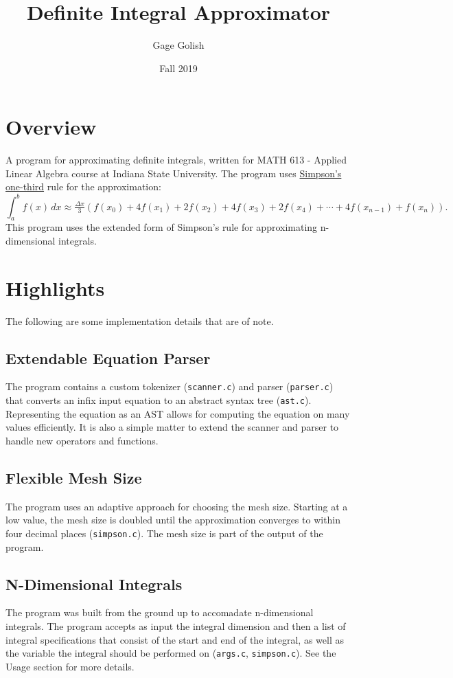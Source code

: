 \documentclass[11pt]{article}
\author{Gage Golish}
\date{Fall 2019}
\title{Definite Integral Approximator}
\begin{document}
\maketitle
\tableofcontents


\section{Overview}
\label{sec:orgc539d49}
A program for approximating definite integrals, written for MATH
613 - Applied Linear Algebra course at Indiana State University. The
program uses \href{https://en.wikipedia.org/wiki/Simpson\%27s\_rule}{Simpson's one-third} rule for the approximation:
$$\displaystyle \int _{a}^{b}f(x)\,dx\approx {\tfrac {\Delta
  x}{3}}\left(f(x_{0})+4f(x_{1})+2f(x_{2})+4f(x_{3})+2f(x_{4})+\cdots
  +4f(x_{n-1})+f(x_{n})\right).$$
This program uses the extended form of Simpson's rule for
approximating n-dimensional integrals.

\section{Highlights}
\label{sec:orge958625}
The following are some implementation details that are of note.

\subsection{Extendable Equation Parser}
\label{sec:org25a15be}
The program contains a custom tokenizer (\texttt{scanner.c}) and parser
(\texttt{parser.c}) that converts an infix input equation to an abstract
syntax tree (\texttt{ast.c}). Representing the equation as an AST allows
for computing the equation on many values efficiently. It is also a
simple matter to extend the scanner and parser to handle new
operators and functions.

\subsection{Flexible Mesh Size}
\label{sec:orgec9d46b}
The program uses an adaptive approach for choosing the mesh
size. Starting at a low value, the mesh size is doubled until the
approximation converges to within four decimal places (\texttt{simpson.c}). The
mesh size is part of the output of the program.

\subsection{N-Dimensional Integrals}
\label{sec:org3e83043}
The program was built from the ground up to accomadate
n-dimensional integrals. The program accepts as input the integral
dimension and then a list of integral specifications that consist
of the start and end of the integral, as well as the variable the
integral should be performed on (\texttt{args.c}, \texttt{simpson.c}). See the
Usage section for more details.
\end{document}
